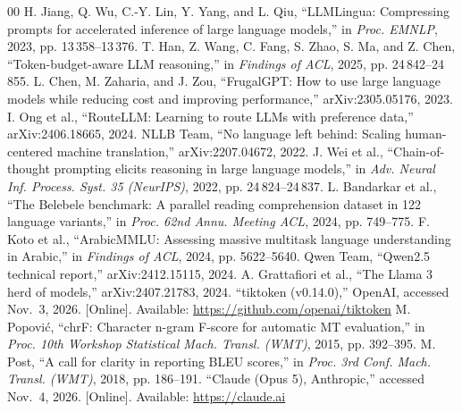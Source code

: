 \documentclass[conference,a4paper]{IEEEtran}
\begin{document}
\begin{thebibliography}{00}
 H. Jiang, Q. Wu, C.-Y. Lin, Y. Yang, and L. Qiu, ``LLMLingua: Compressing prompts for accelerated inference of large language models,'' in \emph{Proc. EMNLP}, 2023, pp. 13\,358--13\,376.
 T. Han, Z. Wang, C. Fang, S. Zhao, S. Ma, and Z. Chen, ``Token-budget-aware LLM reasoning,'' in \emph{Findings of ACL}, 2025, pp. 24\,842--24\,855.
 L. Chen, M. Zaharia, and J. Zou, ``FrugalGPT: How to use large language models while reducing cost and improving performance,'' arXiv:2305.05176, 2023.
 I. Ong et al., ``RouteLLM: Learning to route LLMs with preference data,'' arXiv:2406.18665, 2024.
 NLLB Team, ``No language left behind: Scaling human-centered machine translation,'' arXiv:2207.04672, 2022.
 J. Wei et al., ``Chain-of-thought prompting elicits reasoning in large language models,'' in \emph{Adv. Neural Inf. Process. Syst. 35 (NeurIPS)}, 2022, pp. 24\,824--24\,837.
 L. Bandarkar et al., ``The Belebele benchmark: A parallel reading comprehension dataset in 122 language variants,'' in \emph{Proc. 62nd Annu. Meeting ACL}, 2024, pp. 749--775.
 F. Koto et al., ``ArabicMMLU: Assessing massive multitask language understanding in Arabic,'' in \emph{Findings of ACL}, 2024, pp. 5622--5640.
 Qwen Team, ``Qwen2.5 technical report,'' arXiv:2412.15115, 2024.
 A. Grattafiori et al., ``The Llama 3 herd of models,'' arXiv:2407.21783, 2024.
 ``tiktoken (v0.14.0),'' OpenAI, accessed Nov.\ 3, 2026. [Online]. Available: \url{https://github.com/openai/tiktoken}
 M. Popovi\'c, ``chrF: Character n-gram F-score for automatic MT evaluation,'' in \emph{Proc. 10th Workshop Statistical Mach. Transl. (WMT)}, 2015, pp. 392--395.
 M. Post, ``A call for clarity in reporting BLEU scores,'' in \emph{Proc. 3rd Conf. Mach. Transl. (WMT)}, 2018, pp. 186--191.
 ``Claude (Opus 5), Anthropic,'' accessed Nov.\ 4, 2026. [Online]. Available: \url{https://claude.ai}
\end{thebibliography}
\end{document}
